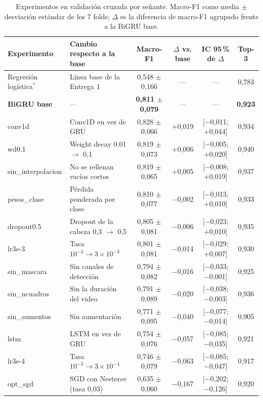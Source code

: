 \documentclass[11pt,a4paper]{article}
\begin{document}
\begin{table}[htbp]
\centering
\caption{Experimentos en validación cruzada por señante. Macro-F1 como media $\pm$ desviación estándar de los 7 folds; $\Delta$ es la diferencia de macro-F1 agrupado frente a la BiGRU base.}\label{tab:experimentos}
\small
\renewcommand{\arraystretch}{1.12}
\begin{tabularx}{\textwidth}{@{}lYcccc@{}}
\toprule
\textbf{Experimento} & \textbf{Cambio respecto a la base} & \textbf{Macro-F1} & \textbf{$\Delta$ vs. base} & \textbf{IC 95\,\% de $\Delta$} & \textbf{Top-3}\\
\midrule
Regresión logística$^{\ast}$ & Línea base de la Entrega 1 & 0,548 $\pm$ 0,166 & --- & --- & 0,783\\
\textbf{BiGRU base} & --- & \textbf{0,811 $\pm$ 0,079} & --- & --- & \textbf{0,923}\\
\midrule
conv1d & Conv1D en vez de GRU & 0,828 $\pm$ 0,066 & +0,019 & [$-$0,011; +0,044] & 0,934\\
wd0.1 & Weight decay 0,01 $\rightarrow$ 0,1 & 0,819 $\pm$ 0,073 & +0,006 & [$-$0,005; +0,020] & 0,940\\
sin\_interpolacion & No se rellenan vacíos cortos & 0,819 $\pm$ 0,065 & +0,005 & [$-$0,008; +0,019] & 0,937\\
pesos\_clase & Pérdida ponderada por clase & 0,810 $\pm$ 0,077 & $-$0,002 & [$-$0,013; +0,010] & 0,933\\
dropout0.5 & Dropout de la cabeza 0,3 $\rightarrow$ 0,5 & 0,805 $\pm$ 0,081 & $-$0,006 & [$-$0,023; +0,010] & 0,935\\
lr3e-3 & Tasa $10^{-3} \rightarrow 3\times10^{-3}$ & 0,801 $\pm$ 0,081 & $-$0,014 & [$-$0,029; +0,007] & 0,930\\
\midrule
sin\_mascara & Sin canales de detección & 0,794 $\pm$ 0,082 & $-$0,016 & [$-$0,033; $-$0,001] & 0,925\\
sin\_ncuadros & Sin la duración del video & 0,791 $\pm$ 0,089 & $-$0,020 & [$-$0,038; $-$0,003] & 0,936\\
sin\_aumentos & Sin aumentación & 0,771 $\pm$ 0,095 & $-$0,040 & [$-$0,077; $-$0,014] & 0,905\\
lstm & LSTM en vez de GRU & 0,754 $\pm$ 0,076 & $-$0,057 & [$-$0,085; $-$0,035] & 0,921\\
lr3e-4 & Tasa $10^{-3} \rightarrow 3\times10^{-4}$ & 0,746 $\pm$ 0,079 & $-$0,063 & [$-$0,085; $-$0,047] & 0,917\\
\midrule
opt\_sgd & SGD con Nesterov (tasa 0,03) & 0,635 $\pm$ 0,060 & $-$0,167 & [$-$0,202; $-$0,126] & 0,920\\

\end{tabularx}
\end{table}
\end{document}
